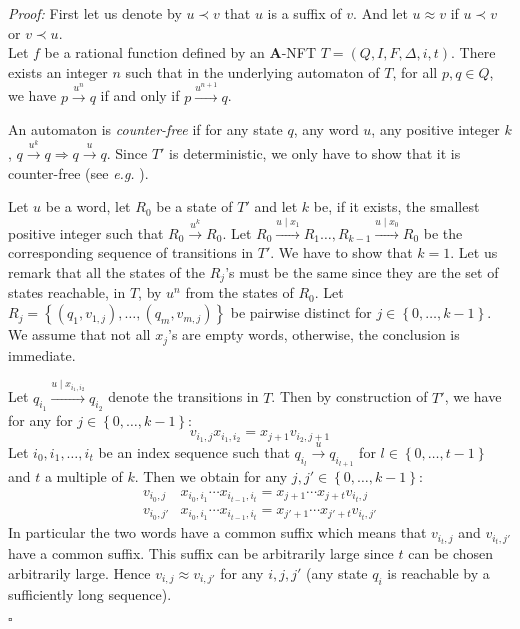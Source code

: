 \documentclass[12pt]{report}
\theoremstyle{definition}
\theoremstyle{remark}
\newenvironment{prf}
{\textit{Proof:}}
{\hfill $\square$\\}
\begin{document}
\begin{prf} 
First let us denote by $u \prec v$ that $u$ is a suffix of $v$. And let $u\approx v$ if $u \prec v$ or $v \prec u$.\\
Let $f$ be a rational function defined by an \textbf A-NFT $T=(Q,I,F,\Delta,i,t)$.
There exists an integer $n$ such that in the underlying automaton of $T$, for all $p,q\in Q$, we have $p\xrightarrow {u^n}q$ if and only if $p\xrightarrow {u^{n+1}}q$.


An automaton is \emph{counter-free} if for any state $q$, any word $u$, any positive integer $k$, $q\xrightarrow{u^k}q \Rightarrow q\xrightarrow{u}q$.
Since $T'$ is deterministic, we only have to show that it is counter-free (see \emph{e.g.} \cite{diekertg08}).

Let $u$ be a word, let $R_0$ be a state of $T'$ and let $k$ be, if it exists, the smallest positive integer such that $R_0\xrightarrow{u^k}R_0$. Let $R_0\xrightarrow{u\mid x_1}R_1\ldots, R_{k-1}\xrightarrow{u\mid x_0}R_{0}$ be the corresponding sequence of transitions in $T'$. We have to show that $k=1$.
Let us remark that all the states of the $R_j$'s must be the same since they are the set of states reachable, in $T$, by $u^n$ from the states of $R_0$. Let $R_j=\left\{(q_1,v_{1,j}),\ldots, (q_m,v_{m,j})\right\}$ be pairwise distinct for $j\in\left\{ 0,\ldots, k-1 \right\}$. We assume that not all $x_j$'s are empty words, otherwise, the conclusion is immediate.

Let $q_{i_1}\xrightarrow {u\mid x_{i_1,i_2}} q_{i_2}$ denote the transitions in $T$. Then by construction of $T'$, we have for any for $j\in\left\{ 0,\ldots, k-1 \right\}$: $$v_{i_1,j}x_{i_1,i_2}=x_{j+1}v_{i_2,j+1}$$
Let $i_0,i_1,\ldots, i_t$ be an index sequence such that $q_{i_l}\xrightarrow uq_{i_{l+1}}$ for $l\in\left\{ 0,\ldots,t-1\right\}$ and $t$ a multiple of $k$.
Then we obtain for any $j,j'\in\left\{ 0,\ldots, k-1 \right\}$:
$$\begin{array}{rll} 
v_{i_0,j}&x_{i_0,i_1}\cdots x_{i_{t-1},i_t}=x_{j+1}\cdots x_{j+t}v_{i_t,j}\\
v_{i_0,j'}&x_{i_0,i_1}\cdots x_{i_{t-1},i_t}=x_{j'+1}\cdots x_{j'+t}v_{i_t,j'}
\end{array}$$
In particular the two words have a common suffix which means that $v_{i_t,j}$ and $v_{i_t,j'}$ have a common suffix.
This suffix can be arbitrarily large since $t$ can be chosen arbitrarily large.
Hence $v_{i,j} \approx v_{i,j'}$ for any $i,j,j'$ (any state $q_i$ is reachable by a sufficiently long sequence).


\end{prf}
\end{document}
